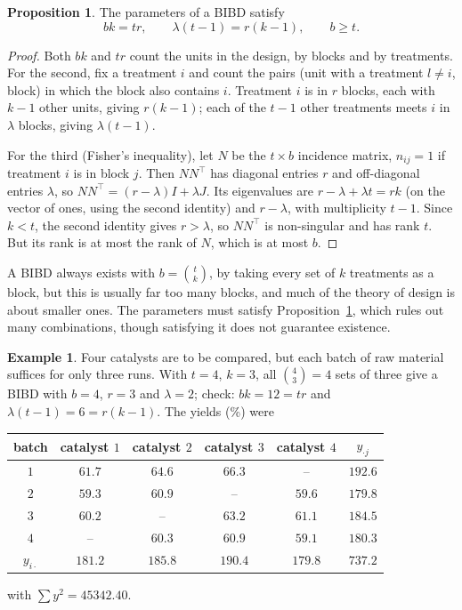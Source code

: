 \documentclass[11pt,a4paper]{article}
\numberwithin{equation}{section}
\theoremstyle{definition}
\newtheorem{exa}[thm]{Example}
\newtheorem{prop}[thm]{Proposition}
\begin{document}
\begin{prop}\label{prop:bibd}
The parameters of a BIBD satisfy
\[
bk = tr , \qquad \lambda(t - 1) = r(k - 1) , \qquad b \ge t .
\]
\end{prop}

\begin{proof}
Both $bk$ and $tr$ count the units in the design, by blocks and by treatments. For the second, fix a treatment $i$ and count the pairs (unit with a
treatment $l \ne i$, block) in which the block also contains $i$. Treatment $i$ is in $r$ blocks, each with $k - 1$ other units, giving $r(k - 1)$; each of the $t - 1$
other treatments meets $i$ in $\lambda$ blocks, giving $\lambda(t - 1)$.

For the third (Fisher's inequality), let $N$ be the $t \times b$ incidence matrix, $n_{ij} = 1$ if treatment $i$ is in block $j$. Then $NN^\top$ has diagonal entries $r$ and
off-diagonal entries $\lambda$, so $NN^\top = (r - \lambda)I + \lambda J$. Its eigenvalues are $r - \lambda + \lambda t = rk$ (on the vector of ones, using the second identity) and $r - \lambda$, with
multiplicity $t - 1$. Since $k < t$, the second identity gives $r > \lambda$, so $NN^\top$ is non-singular and has rank $t$. But its rank is at most the rank of $N$, which is at
most $b$.
\end{proof}

A BIBD always exists with $b = \binom tk$, by taking every set of $k$ treatments as a block, but this is usually far too many blocks, and much of the
theory of design is about smaller ones. The parameters must satisfy Proposition~\ref{prop:bibd}, which rules out many combinations, though
satisfying it does not guarantee existence.

\begin{exa}\label{exa:catalysts}
Four catalysts are to be compared, but each batch of raw material suffices for only three runs. With $t = 4$, $k = 3$, all $\binom43 = 4$ sets of three give a
BIBD with $b = 4$, $r = 3$ and $\lambda = 2$; check: $bk = 12 = tr$ and $\lambda(t - 1) = 6 = r(k - 1)$. The yields (\%) were
\begin{center}
\begin{tabular}{c|cccc|c}
batch & catalyst $1$ & catalyst $2$ & catalyst $3$ & catalyst $4$ & $y_{\cdot j}$ \\
\hline
$1$ & $61.7$ & $64.6$ & $66.3$ & -- & $192.6$ \\
$2$ & $59.3$ & $60.9$ & -- & $59.6$ & $179.8$ \\
$3$ & $60.2$ & -- & $63.2$ & $61.1$ & $184.5$ \\
$4$ & -- & $60.3$ & $60.9$ & $59.1$ & $180.3$ \\
\hline
$y_{i\cdot}$ & $181.2$ & $185.8$ & $190.4$ & $179.8$ & $737.2$
\end{tabular}
\end{center}
with $\sum y^2 = 45342.40$.
\end{exa}
\end{document}
